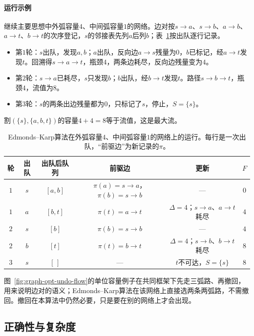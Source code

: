 \paragraph{运行示例}
继续主要思想中外弧容量$4$、中间弧容量$1$的网络。边对按$s\to a$、$s\to b$、$a\to b$、$a\to t$、$b\to t$的次序登记，$s$的邻接表先列$a$后列$b$；表~\ref{tab:graph-opt-edmonds-karp-trace}按出队逐行记录。
\begin{itemize}
  \item 第$1$轮：$s$出队，发现$a,b$；$a$出队，反向边$a\to s$残量为$0$，$b$已标记，经$a\to t$发现$t$。回溯得$s\to a\to t$，瓶颈$4$，两条边耗尽，反向边残量变为$4$。
  \item 第$2$轮：$s\to a$已耗尽，$s$只发现$b$；$b$出队，经$b\to t$发现$t$。路径$s\to b\to t$，瓶颈$4$，流值为$8$。
  \item 第$3$轮：$s$的两条出边残量都为$0$，只标记了$s$，停止，$S=\{s\}$。
\end{itemize}
割$(\{s\},\{a,b,t\})$的容量$4+4=8$等于流值，这是最大流。

\begin{table}[!htb]
  \centering
  \begin{tabular}{@{}cccccc@{}}
    \toprule
    轮 & 出队 & 出队后队列 & 前驱边 & 更新 & $F$ \\
    \midrule
    $1$ & $s$ & $[a,b]$ & $\pi(a)=s\to a$，$\pi(b)=s\to b$ & — & $0$ \\
    $1$ & $a$ & $[b,t]$ & $\pi(t)=a\to t$ & $\Delta=4$；$s\to a$、$a\to t$耗尽 & $4$ \\
    $2$ & $s$ & $[b]$ & $\pi(b)=s\to b$ & — & $4$ \\
    $2$ & $b$ & $[t]$ & $\pi(t)=b\to t$ & $\Delta=4$；$s\to b$、$b\to t$耗尽 & $8$ \\
    $3$ & $s$ & $[\,]$ & — & $t$不可达，$S=\{s\}$ & $8$ \\
    \bottomrule
  \end{tabular}
  \caption{Edmonds--Karp算法在外弧容量$4$、中间弧容量$1$的网络上的运行。每行是一次出队，“前驱边”为新记录的$\pi$。}
  \label{tab:graph-opt-edmonds-karp-trace}
\end{table}

图~\ref{fig:graph-opt-undo-flow}的单位容量例子在共同框架下先走三弧路、再撤回，用来说明边对的语义；Edmonds--Karp算法在该网络上直接选两条两弧路，不需撤回。撤回在本算法中仍然必要，只是要在别的网络上才会出现。

\subsection{正确性与复杂度}

